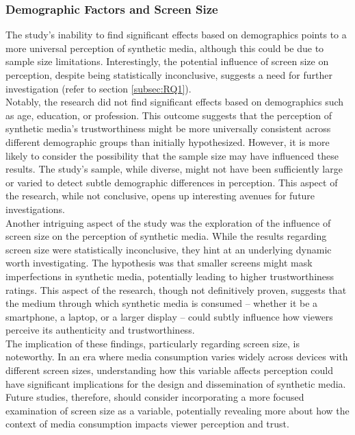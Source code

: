 \documentclass[
  a4paper,  %
  twoside,  %
  bibliography=totoc,
  headsepline,
  cleardoublepage=empty,
  parskip=half,
  draft=false
]{scrbook}
\begin{document}
\subsubsection{Demographic Factors and Screen Size}
The study's inability to find significant effects based on demographics points to a more universal perception of synthetic media, although this could be due to sample size limitations. Interestingly, the potential influence of screen size on perception, despite being statistically inconclusive, suggests a need for further investigation (refer to section \ref{subsec:RQ1}). \\
Notably, the research did not find significant effects based on demographics such as age, education, or profession. This outcome suggests that the perception of synthetic media's trustworthiness might be more universally consistent across different demographic groups than initially hypothesized. However, it is more likely to consider the possibility that the sample size may have influenced these results. The study's sample, while diverse, might not have been sufficiently large or varied to detect subtle demographic differences in perception. This aspect of the research, while not conclusive, opens up interesting avenues for future investigations. \\
Another intriguing aspect of the study was the exploration of the influence of screen size on the perception of synthetic media. While the results regarding screen size were statistically inconclusive, they hint at an underlying dynamic worth investigating. The hypothesis was that smaller screens might mask imperfections in synthetic media, potentially leading to higher trustworthiness ratings. This aspect of the research, though not definitively proven, suggests that the medium through which synthetic media is consumed – whether it be a smartphone, a laptop, or a larger display – could subtly influence how viewers perceive its authenticity and trustworthiness. \\
The implication of these findings, particularly regarding screen size, is noteworthy. In an era where media consumption varies widely across devices with different screen sizes, understanding how this variable affects perception could have significant implications for the design and dissemination of synthetic media. Future studies, therefore, should consider incorporating a more focused examination of screen size as a variable, potentially revealing more about how the context of media consumption impacts viewer perception and trust.
\end{document}
